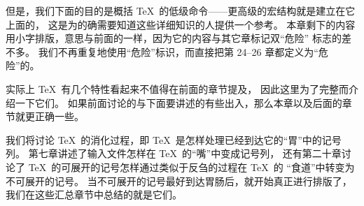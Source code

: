 \medskip\ninepoint
但是，我们下面的目的是概括 \TeX\ 的低级命令——更高级的宏结构就是建立在它上面的，
这是为的确需要知道这些详细知识的人提供一个参考。%
本章剩下的内容用小字排版，意思与前面的一样，因为它的内容与其它章标记双``危险''%
标志的差不多。%
我们不再重复地使用``危险''标识，而直接把第 24--26 章都定义为``危险''的。

\medbreak
实际上 \TeX\ 有几个特性看起来不值得在前面的章节提及，
因此这里为了完整而介绍一下它们。%
如果前面讨论的与下面要讲述的有些出入，那么本章以及后面的章节就更正确一些。

\medbreak
我们将讨论 \TeX\ 的消化过程，即 \TeX\ 是怎样处理已经到达它的``胃''中的记号列。%
第七章讲述了输入文件怎样在 \TeX\ 的``嘴''中变成记号列，
还有第二十章讨论了 \TeX\ 的可展开的记号怎样通过类似于反刍的过程在 \TeX\ 的%
``食道''中转变为不可展开的记号。%
当不可展开的记号最好到达胃肠后，就开始真正进行排版了，
我们在这些汇总章节中总结的就是它们。

